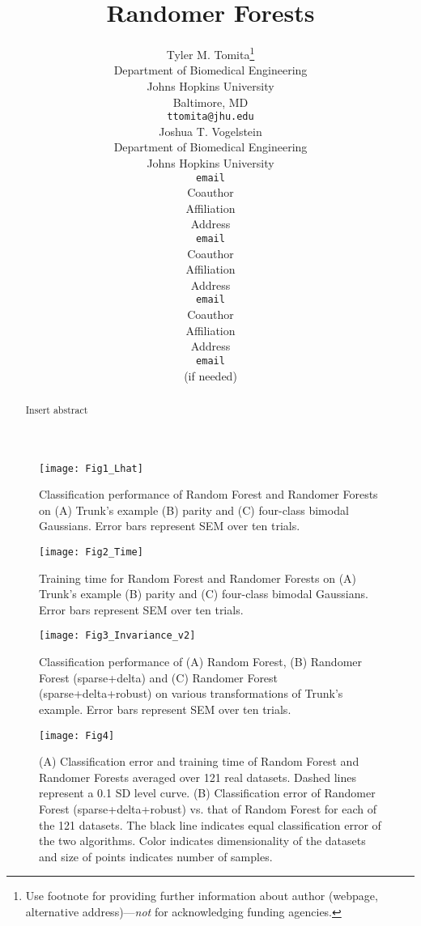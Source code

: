 \documentclass{article} %
\title{Randomer Forests}
\author{
Tyler M. Tomita\thanks{ Use footnote for providing further information
about author (webpage, alternative address)---\emph{not} for acknowledging
funding agencies.} \\
Department of Biomedical Engineering\\
Johns Hopkins University\\
Baltimore, MD \\
\texttt{ttomita@jhu.edu} \\
\And
Joshua T. Vogelstein \\
Department of Biomedical Engineering \\
Johns Hopkins University \\
\texttt{email} \\
\AND
Coauthor \\
Affiliation \\
Address \\
\texttt{email} \\
\And
Coauthor \\
Affiliation \\
Address \\
\texttt{email} \\
\And
Coauthor \\
Affiliation \\
Address \\
\texttt{email} \\
(if needed)\\
}
\begin{document}
\maketitle

\begin{abstract}
Insert abstract
\end{abstract}


\begin{figure}[h]
\begin{center}
\texttt{[image: Fig1\_Lhat]}
\end{center}
\caption{Classification performance of Random Forest and Randomer Forests on (A) Trunk's example (B) parity and (C) four-class bimodal Gaussians. Error bars represent SEM over ten trials.}
\end{figure}

\begin{figure}[h]
\begin{center}
\texttt{[image: Fig2\_Time]}
\end{center}
\caption{Training time for Random Forest and Randomer Forests on (A) Trunk's example (B) parity and (C) four-class bimodal Gaussians. Error bars represent SEM over ten trials.}
\end{figure}

\begin{figure}[h]
\begin{center}
\texttt{[image: Fig3\_Invariance\_v2]}
\end{center}
\caption{Classification performance of (A) Random Forest, (B) Randomer Forest (sparse+delta) and (C) Randomer Forest (sparse+delta+robust) on various transformations of Trunk's example. Error bars represent SEM over ten trials.}
\end{figure}

\begin{figure}[h]
\begin{center}
\texttt{[image: Fig4]}
\end{center}
\caption{(A) Classification error and training time of Random Forest and Randomer Forests averaged over 121 real datasets. Dashed lines represent a 0.1 SD level curve. (B) Classification error of Randomer Forest (sparse+delta+robust) vs. that of Random Forest for each of the 121 datasets. The black line indicates equal classification error of the two algorithms. Color indicates dimensionality of the datasets and size of points indicates number of samples.}
\end{figure}
\end{document}
